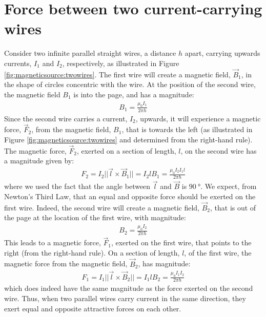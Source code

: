 \section{Force between two current-carrying wires}
Consider two infinite parallel straight wires, a distance $h$ apart, carrying upwards currents, $I_1$ and $I_2$, respectively, as illustrated in Figure \ref{fig:magneticsource:twowires}.
The first wire will create a magnetic field, $\vec B_1$, in the shape of circles concentric with the wire. At the position of the second wire, the magnetic field $B_1$ is into the page, and has a magnitude:
\begin{align*}
B_1 = \frac{\mu_0 I_1}{2\pi h}
\end{align*} 
Since the second wire carries a current, $I_2$, upwards, it will experience a magnetic force, $\vec F_2$, from the magnetic field, $B_1$, that is towards the left (as illustrated in Figure \ref{fig:magneticsource:twowires} and determined from the right-hand rule). The magnetic force, $\vec F_2$, exerted on a section of length, $l$, on the second wire has a magnitude given by:
\begin{align*}
F_2 = I_2 ||\vec l \times \vec B_1||=I_2 l B_1 =\frac{\mu_0 I_2 I_1 l}{2\pi h}
\end{align*}
where we used the fact that the angle between $\vec l$ and $\vec B$ is $\SI{90}{\degree}$. We expect, from Newton's Third Law, that an equal and opposite force should be exerted on the first wire. Indeed, the second wire will create a magnetic field, $\vec B_2$, that is out of the page at the location of the first wire, with magnitude:
\begin{align*}
B_2 = \frac{\mu_0 I_2}{2\pi h}
\end{align*}
This leads to a magnetic force, $\vec F_1$, exerted on the first wire, that points to the right (from the right-hand rule). On a section of length, $l$, of the first wire, the magnetic force from the magnetic field, $\vec B_2$, has magnitude:
\begin{align*}
F_1 = I_1 ||\vec l \times \vec B_2||=I_1 l B_2 =\frac{\mu_0 I_1 I_2}{2\pi h}
\end{align*}
which does indeed have the same magnitude as the force exerted on the second wire. Thus, when two parallel wires carry current in the same direction, they exert equal and opposite attractive forces on each other. 


